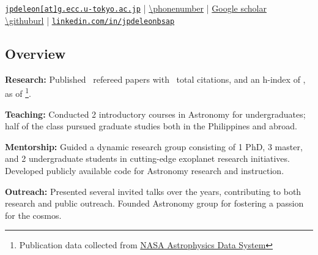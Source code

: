 \documentclass[12pt,letterpaper]{article}
\newcommand{\makefield}[2]{\makebox[1.5em]{#1} #2}
\begin{document}
\thispagestyle{empty}\sloppy\sloppypar\raggedbottom

\textbf{\Large \fullname} \\[0.5ex]
\currentposition \\
\textsf{\small 
    \makefield{\faEnvelope[regular]}{\href{mailto:\email}{\texttt{jpdeleon[at]g.ecc.u-tokyo.ac.jp}}} | %
    \makefield{\faPhone}{\url{\phonenumber}} | %
    \makefield{\faBook}{\href{\scholarurl}}{Google scholar} \\ %
    \makefield{\faGlobe}{\url{\githuburl}} | %
    \makefield{\faLinkedin}{\href{\linkedinurl}{\texttt{linkedin.com/in/jpdeleonbsap}}}
}\\[0.5ex]

\subsection{Overview}
\begin{list}{}{\cvlist}
    \item \textbf{Research:} Published \pubsnumber\ refereed papers with \pubscitations\ total citations, and an h-index of \pubshindex, as of \pubsdate\footnote{Publication data collected from \href{https://ui.adsabs.harvard.edu/}{NASA Astrophysics Data System}}. 
    \item \textbf{Teaching:} Conducted 2 introductory courses in Astronomy for undergraduates; half of the class pursued graduate studies both in the Philippines and abroad.
    \item \textbf{Mentorship:} Guided a dynamic research group consisting of 1 PhD, 3 master, and 2 undergraduate students in cutting-edge exoplanet research initiatives. Developed publicly available code for Astronomy research and instruction.
    \item \textbf{Outreach:} Presented several invited talks over the years, contributing to both research and public outreach. Founded Astronomy group for fostering a passion for the cosmos.
\end{list}
\end{document}
